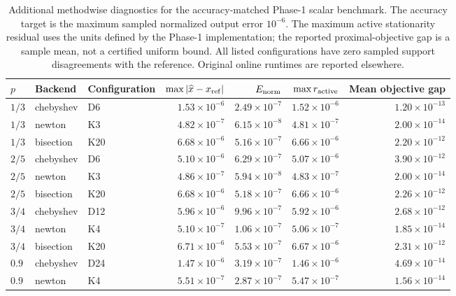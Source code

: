 \begin{table}[t]
\centering\scriptsize
\setlength{\tabcolsep}{3pt}
\caption{Additional methodwise diagnostics for the accuracy-matched Phase-1 scalar benchmark.
The accuracy target is the maximum sampled normalized output error $10^{-6}$.
The maximum active stationarity residual uses the units defined by the Phase-1 implementation;
the reported proximal-objective gap is a sample mean, not a certified uniform bound.
All listed configurations have zero sampled support disagreements with the reference.
Original online runtimes are reported elsewhere.}
\label{tab:phase4-scalar-methodwise}
\begin{tabular}{@{}lllrrrr@{}}
\toprule
$p$ & Backend & Configuration & $\max|\widehat x-x_{\rm ref}|$ & $E_{\rm norm}$ & $\max r_{\rm active}$ & Mean objective gap \\
\midrule
$1/3$ & chebyshev & D6 & $1.53\times10^{-6}$ & $2.49\times10^{-7}$ & $1.52\times10^{-6}$ & $1.20\times10^{-13}$ \\
$1/3$ & newton & K3 & $4.82\times10^{-7}$ & $6.15\times10^{-8}$ & $4.81\times10^{-7}$ & $2.00\times10^{-14}$ \\
$1/3$ & bisection & K20 & $6.68\times10^{-6}$ & $5.16\times10^{-7}$ & $6.66\times10^{-6}$ & $2.20\times10^{-12}$ \\
$2/5$ & chebyshev & D6 & $5.10\times10^{-6}$ & $6.29\times10^{-7}$ & $5.07\times10^{-6}$ & $3.90\times10^{-12}$ \\
$2/5$ & newton & K3 & $4.86\times10^{-7}$ & $5.94\times10^{-8}$ & $4.83\times10^{-7}$ & $2.00\times10^{-14}$ \\
$2/5$ & bisection & K20 & $6.68\times10^{-6}$ & $5.18\times10^{-7}$ & $6.66\times10^{-6}$ & $2.26\times10^{-12}$ \\
$3/4$ & chebyshev & D12 & $5.96\times10^{-6}$ & $9.96\times10^{-7}$ & $5.92\times10^{-6}$ & $2.68\times10^{-12}$ \\
$3/4$ & newton & K4 & $5.10\times10^{-7}$ & $1.06\times10^{-7}$ & $5.06\times10^{-7}$ & $1.85\times10^{-14}$ \\
$3/4$ & bisection & K20 & $6.71\times10^{-6}$ & $5.53\times10^{-7}$ & $6.67\times10^{-6}$ & $2.31\times10^{-12}$ \\
$0.9$ & chebyshev & D24 & $1.47\times10^{-6}$ & $3.19\times10^{-7}$ & $1.46\times10^{-6}$ & $4.69\times10^{-14}$ \\
$0.9$ & newton & K4 & $5.51\times10^{-7}$ & $2.87\times10^{-7}$ & $5.47\times10^{-7}$ & $1.56\times10^{-14}$ \\

\end{tabular}
\end{table}
